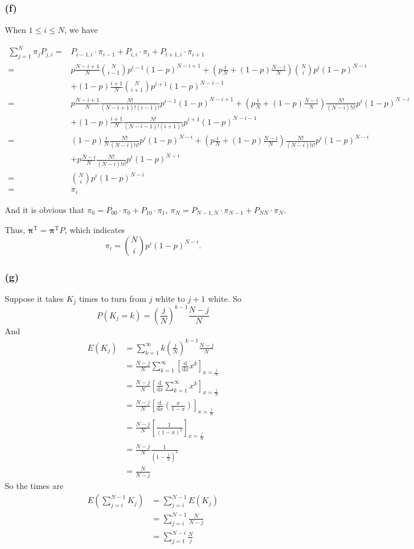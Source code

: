 \documentclass{article}
\begin{document}
\subsubsection*{(f)}
When $1\leq i\leq N$, we have
\begin{footnotesize}
\begin{align*}
\sum_{j=1}^{N}\pi_{j}P_{j,i}=&P_{i-1,i}\cdot\pi_{i-1}+P_{i,i}\cdot\pi_{i}+P_{i+1,i}\cdot\pi_{i+1}\\
=&p\frac{N-i+1}{N}\binom{N}{i-1}p^{i-1}(1-p)^{N-i+1}+\left(p\frac{i}{N}+(1-p)\frac{N-i}{N}\right)\binom{N}{i}p^{i}(1-p)^{N-i}\\
&+(1-p)\frac{i+1}{N}\binom{N}{i+1}p^{i+1}(1-p)^{N-i-1}\\
=&p\frac{N-i+1}{N}\frac{N!}{(N-i+1)!(i-1)!}p^{i-1}(1-p)^{N-i+1}+\left(p\frac{i}{N}+(1-p)\frac{N-i}{N}\right)\frac{N!}{(N-i)!i!}p^{i}(1-p)^{N-i}\\
&+(1-p)\frac{i+1}{N}\frac{N!}{(N-i-1)!(i+1)!}p^{i+1}(1-p)^{N-i-1}\\
=&(1-p)\frac{i}{N}\frac{N!}{(N-i)!i!}p^{i}(1-p)^{N-i}+\left(p\frac{i}{N}+(1-p)\frac{N-i}{N}\right)\frac{N!}{(N-i)!i!}p^{i}(1-p)^{N-i}\\
&+p\frac{N-i}{N}\frac{N!}{(N-i)!i!}p^{i}(1-p)^{N-i}\\
=&\binom{N}{i}p^{i}(1-p)^{N-i}\\
=&\pi_{i}
\end{align*}
\end{footnotesize}
And it is obvious that $\pi_{0}=P_{00}\cdot\pi_{0}+P_{10}\cdot\pi_{1}$, $\pi_{N}=P_{N-1,N}\cdot\pi_{N-1}+P_{NN}\cdot\pi_{N}$.

Thus, $\bm{\pi}^{\mathrm{T}}=\bm{\pi}^{\mathrm{T}}P$, which indicates $$\pi_{i}=\binom{N}{i}p^{i}(1-p)^{N-i}.$$
\subsubsection*{(g)}
Suppose it takes $K_{j}$ times to turn from $j$ white to $j+1$ white.
So$$P(K_{j}=k)=\left(\frac{j}{N}\right)^{k-1}\frac{N-j}{N}$$
And
\begin{align*}
E(K_{j})&=\sum_{k=1}^{\infty}k\left(\frac{j}{N}\right)^{k-1}\frac{N-j}{N}\\
&=\frac{N-j}{N}\sum_{k=1}^{\infty}\left[\frac{\mathrm{d}}{\mathrm{d}x}x^{k}\right]_{x=\frac{j}{N}}\\
&=\frac{N-j}{N}\left[\frac{\mathrm{d}}{\mathrm{d}x}\sum_{k=1}^{\infty}x^{k}\right]_{x=\frac{j}{N}}\\
&=\frac{N-j}{N}\left[\frac{\mathrm{d}}{\mathrm{d}x}\left(\frac{x}{1-x}\right)\right]_{x=\frac{j}{N}}\\
&=\frac{N-j}{N}\left[\frac{1}{(1-x)^{2}}\right]_{x=\frac{j}{N}}\\
&=\frac{N-j}{N}\frac{1}{(1-\frac{j}{N})^{2}}\\
&=\frac{N}{N-j}
\end{align*}
So the times are
\begin{align*}
E(\sum_{j=i}^{N-1}K_{j})&=\sum_{j=i}^{N-1}E(K_{j})\\
&=\sum_{j=i}^{N-1}\frac{N}{N-j}\\
&=\sum_{j=1}^{N-i}\frac{N}{j}
\end{align*}
\end{document}
